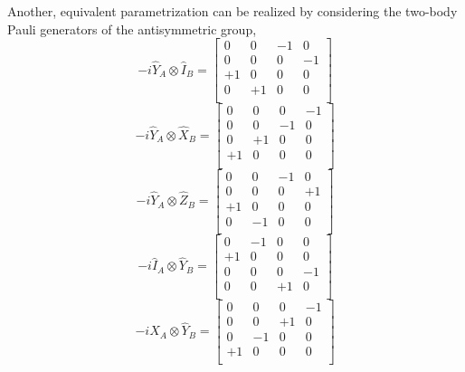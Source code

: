 Another, equivalent parametrization can be realized by considering the two-body
Pauli generators of the antisymmetric group,
\begin{equation}
-i \hat Y_{A} \otimes \hat I_{B}
=
\left [
\begin{array}{cccc}
 0 &  0 & -1 &  0 \\
 0 &  0 &  0 & -1 \\
+1 &  0 &  0 &  0 \\
 0 & +1 &  0 &  0 \\
\end{array}
\right ]
\end{equation}
\begin{equation}
-i \hat Y_{A} \otimes \hat X_{B}
=
\left [
\begin{array}{cccc}
 0 &  0 &  0 & -1 \\
 0 &  0 & -1 &  0 \\
 0 & +1 &  0 &  0 \\
+1 &  0 &  0 &  0 \\
\end{array}
\right ]
\end{equation}
\begin{equation}
-i \hat Y_{A} \otimes \hat Z_{B}
=
\left [
\begin{array}{cccc}
 0 &  0 & -1 &  0 \\
 0 &  0 &  0 & +1 \\
+1 &  0 &  0 &  0 \\
 0 & -1 &  0 &  0 \\
\end{array}
\right ]
\end{equation}
\begin{equation}
-i \hat I_{A} \otimes \hat Y_{B}
=
\left [
\begin{array}{cccc}
 0 & -1 &  0 &  0 \\
+1 &  0 &  0 &  0 \\
 0 &  0 &  0 & -1 \\
 0 &  0 & +1 &  0 \\
\end{array}
\right ]
\end{equation}
\begin{equation}
-i \hat X_{A} \otimes \hat Y_{B}
=
\left [
\begin{array}{cccc}
 0 &  0 &  0 & -1 \\
 0 &  0 & +1 &  0 \\
 0 & -1 &  0 &  0 \\
+1 &  0 &  0 &  0 \\
\end{array}
\right ]
\end{equation}
